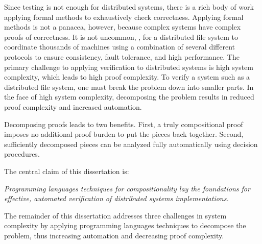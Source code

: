 Since testing is not enough for distributed systems,
  there is a rich body of work applying formal methods
  to exhaustively check correctness.
Applying formal methods is not a panacea, however,
  because complex systems have complex proofs of correctness.
It is not uncommon, \eg,
  for a  distributed file system to coordinate thousands of machines
  using a combination of several different protocols to ensure
  consistency, fault tolerance, and high performance.
The primary challenge to applying verification to distributed systems is
  high system complexity, which leads to high proof complexity.
To verify a system such as a distributed file system,
  one must break the problem down into smaller parts.
In the face of high system complexity,
  decomposing the problem results in reduced proof complexity and increased automation.

Decomposing proofs leads to two benefits.
First, a truly compositional proof
  imposes no additional proof burden
  to put the pieces back together.
Second, sufficiently decomposed pieces can
  be analyzed fully automatically using decision procedures.

The central claim of this dissertation is:
\begin{center}
\emph{Programming languages techniques for compositionality
  lay the foundations for effective, automated verification of
  distributed systems implementations.
}
\end{center}

The remainder of this dissertation addresses three challenges in system complexity
  by applying programming languages techniques to decompose the problem,
  thus increasing automation and decreasing proof complexity.

